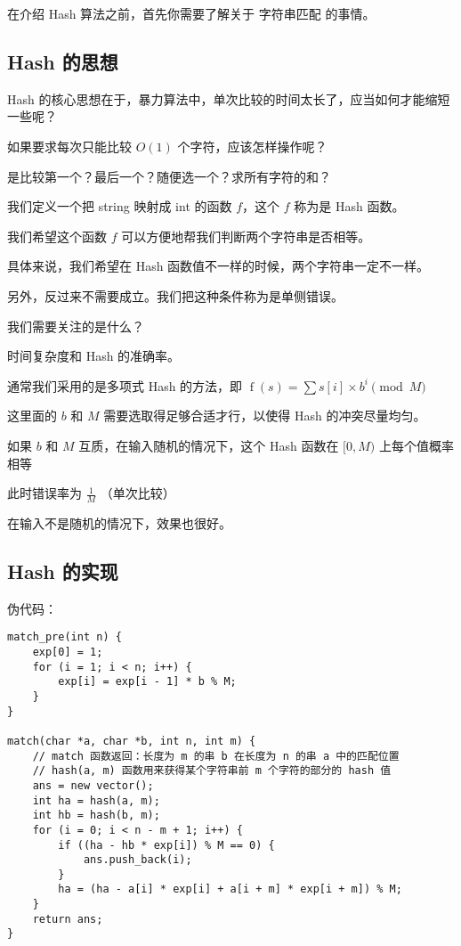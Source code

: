 
在介绍 Hash 算法之前，首先你需要了解关于  字符串匹配  的事情。

\subsection{Hash 的思想}

Hash 的核心思想在于，暴力算法中，单次比较的时间太长了，应当如何才能缩短一些呢？

如果要求每次只能比较 $O(1)$ 个字符，应该怎样操作呢？

是比较第一个？最后一个？随便选一个？求所有字符的和？

我们定义一个把 string 映射成 int 的函数 $f$，这个 $f$ 称为是 Hash 函数。

我们希望这个函数 $f$ 可以方便地帮我们判断两个字符串是否相等。

具体来说，我们希望在 Hash 函数值不一样的时候，两个字符串一定不一样。

另外，反过来不需要成立。我们把这种条件称为是单侧错误。

我们需要关注的是什么？

时间复杂度和 Hash 的准确率。

通常我们采用的是多项式 Hash 的方法，即 $\operatorname{f}(s) = \sum s[i] \times b^i \pmod M$

这里面的 $b$ 和 $M$ 需要选取得足够合适才行，以使得 Hash 的冲突尽量均匀。

如果 $b$ 和 $M$ 互质，在输入随机的情况下，这个 Hash 函数在 $[0,M)$ 上每个值概率相等

此时错误率为 $\frac1M$ （单次比较）

在输入不是随机的情况下，效果也很好。

\subsection{Hash 的实现}

伪代码：

\begin{verbatim}
match_pre(int n) {
    exp[0] = 1;
    for (i = 1; i < n; i++) {
        exp[i] = exp[i - 1] * b % M;
    }
}

match(char *a, char *b, int n, int m) {
    // match 函数返回：长度为 m 的串 b 在长度为 n 的串 a 中的匹配位置
    // hash(a, m) 函数用来获得某个字符串前 m 个字符的部分的 hash 值
    ans = new vector();
    int ha = hash(a, m);
    int hb = hash(b, m);
    for (i = 0; i < n - m + 1; i++) {
        if ((ha - hb * exp[i]) % M == 0) {
            ans.push_back(i);
        }
        ha = (ha - a[i] * exp[i] + a[i + m] * exp[i + m]) % M;
    }
    return ans;
}
\end{verbatim}

